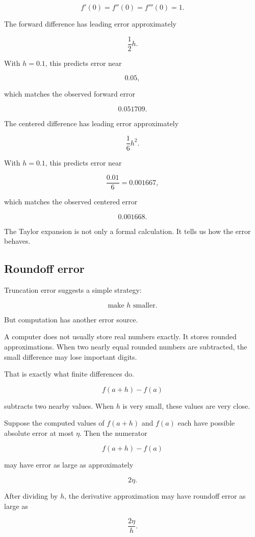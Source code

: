 \[
f'(0)=f''(0)=f'''(0)=1.
\]

The forward difference has leading error approximately

\[
\frac12h.
\]

With \(h=0.1\), this predicts error near

\[
0.05,
\]

which matches the observed forward error

\[
0.051709.
\]

The centered difference has leading error approximately

\[
\frac16h^2.
\]

With \(h=0.1\), this predicts error near

\[
\frac{0.01}{6}=0.001667,
\]

which matches the observed centered error

\[
0.001668.
\]

The Taylor expansion is not only a formal calculation.  It tells us how the error behaves.

\subsection{Roundoff error}
\label{subsec:roundoff-error}

Truncation error suggests a simple strategy:

\[
\text{make \(h\) smaller.}
\]

But computation has another error source.

A computer does not usually store real numbers exactly.  It stores rounded
approximations.  When two nearly equal rounded numbers are subtracted, the small
difference may lose important digits.

That is exactly what finite differences do.

\[
f(a+h)-f(a)
\]

subtracts two nearby values.  When \(h\) is very small, these values are very close.

Suppose the computed values of \(f(a+h)\) and \(f(a)\) each have possible absolute
error at most \(\eta\).  Then the numerator

\[
f(a+h)-f(a)
\]

may have error as large as approximately

\[
2\eta.
\]

After dividing by \(h\), the derivative approximation may have roundoff error as large
as

\[
\frac{2\eta}{h}.
\]

